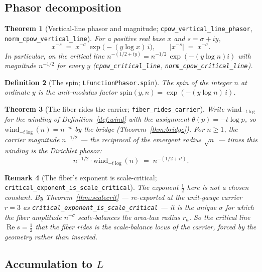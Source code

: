 \documentclass[11pt]{article}
\newtheorem{definition}{Definition}[section]
\newtheorem{theorem}[definition]{Theorem}
\newtheorem{remark}[definition]{Remark}
\DeclareMathOperator{\Ree}{Re}
\newcommand{\code}[1]{\texttt{#1}}
\begin{document}
\subsection{Phasor decomposition}

\begin{theorem}[Vertical-line phasor and magnitude; \code{cpow\_vertical\_line\_phasor}, \code{norm\_cpow\_vertical\_line}]\label{thm:phasor}
For a positive real base $x$ and $s=\sigma+iy$,
\[
  x^{-s} \;=\; x^{-\sigma}\,\exp\!\bigl(-(y\log x)\,i\bigr),\qquad
  \bigl|x^{-s}\bigr| \;=\; x^{-\sigma}.
\]
In particular, on the critical line $n^{-(1/2+iy)}=n^{-1/2}\,\exp(-(y\log n)i)$ with magnitude
$n^{-1/2}$ for every $y$ (\code{cpow\_critical\_line}, \code{norm\_cpow\_critical\_line}).
\end{theorem}

\begin{definition}[The spin; \code{LFunctionPhasor.spin}]\label{def:spin}
The \emph{spin} of the integer $n$ at ordinate $y$ is the unit-modulus factor
$\mathrm{spin}(y,n)=\exp(-(y\log n)\,i)$.
\end{definition}

\begin{theorem}[The fiber rides the carrier; \code{fiber\_rides\_carrier}]\label{thm:rides}
Write $\mathrm{wind}_{-t\log}$ for the winding of Definition~\ref{def:wind} with the assignment
$\theta(p)=-t\log p$, so $\mathrm{wind}_{-t\log}(n)=n^{-it}$ by the bridge (Theorem~\ref{thm:bridge}).
For $n\ge 1$, the carrier magnitude $n^{-1/2}$ --- the reciprocal of the emergent radius $\sqrt n$ ---
times this winding is the Dirichlet phasor:
\[
  n^{-1/2}\cdot\mathrm{wind}_{-t\log}(n) \;=\; n^{-(1/2+it)} .
\]
\end{theorem}

\begin{remark}[The fiber's exponent is scale-critical; \code{critical\_exponent\_is\_scale\_critical}]\label{rem:ridescrit}
The exponent $\tfrac12$ here is not a chosen constant. By Theorem~\ref{thm:scalecrit} --- re-exported at
the unit-gauge carrier $r=3$ as \code{critical\_exponent\_is\_scale\_critical} --- it is the unique
$\sigma$ for which the fiber amplitude $n^{-\sigma}$ scale-balances the area-law radius $r_n$. So the
critical line $\Ree s=\tfrac12$ that the fiber rides is the scale-balance locus of the carrier, forced
by the geometry rather than inserted.
\end{remark}

\subsection{Accumulation to $L$}
\end{document}
